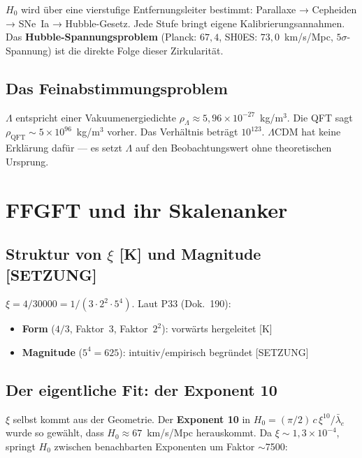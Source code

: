$H_0$ wird über eine vierstufige Entfernungsleiter bestimmt:
Parallaxe → Cepheiden → SNe~Ia → Hubble-Gesetz. Jede Stufe bringt
eigene Kalibrierungsannahmen. Das \textbf{Hubble-Spannungsproblem}
(Planck: $67{,}4$, SH0ES: $73{,}0$~km/s/Mpc, $5\sigma$-Spannung) ist
die direkte Folge dieser Zirkularität.

\section{Das Feinabstimmungsproblem}

$\Lambda$ entspricht einer Vakuumenergiedichte
$\rho_\Lambda \approx 5{,}96\times10^{-27}$~kg/m$^3$.
Die QFT sagt $\rho_\text{QFT} \sim 5\times10^{96}$~kg/m$^3$ vorher.
Das Verhältnis beträgt $10^{123}$. $\Lambda$CDM hat keine Erklärung
dafür — es setzt $\Lambda$ auf den Beobachtungswert ohne
theoretischen Ursprung.

\chapter{FFGFT und ihr Skalenanker}

\section{Struktur von $\xi$ [K] und Magnitude [SETZUNG]}

$\xi = 4/30000 = 1/(3\cdot2^2\cdot5^4)$.
Laut P33 (Dok.~190):

\begin{itemize}
  \item \textbf{Form} ($4/3$, Faktor~3, Faktor~$2^2$): vorwärts hergeleitet [K]
  \item \textbf{Magnitude} ($5^4 = 625$): intuitiv/empirisch begründet [SETZUNG]
\end{itemize}

\section{Der eigentliche Fit: der Exponent 10}

$\xi$ selbst kommt aus der Geometrie. Der \textbf{Exponent 10} in
$H_0 = (\pi/2)\,c\,\xi^{10}/\bar\lambda_e$ wurde so gewählt, dass
$H_0 \approx 67$~km/s/Mpc herauskommt. Da $\xi \sim 1{,}3\times10^{-4}$,
springt $H_0$ zwischen benachbarten Exponenten um Faktor $\sim$7500:

